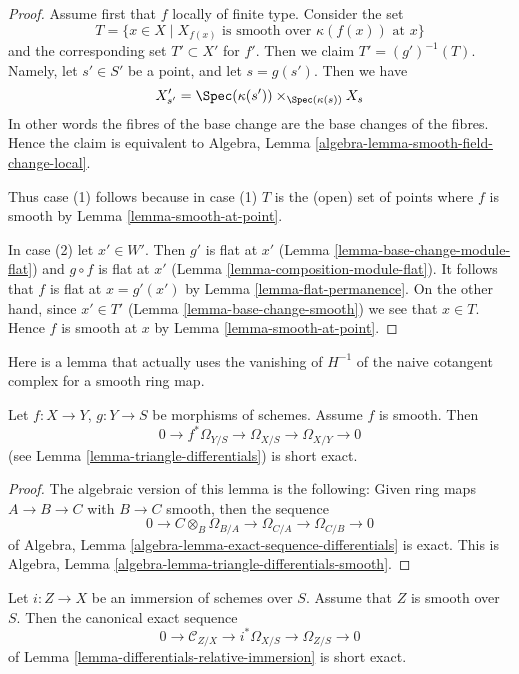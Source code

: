 \begin{proof}
Assume first that $f$ locally of finite type. Consider the set
$$
T = \{x \in X \mid X_{f(x)}\text{ is smooth over }\kappa(f(x))\text{ at }x\}
$$
and the corresponding set $T' \subset X'$ for $f'$. Then we claim
$T' = (g')^{-1}(T)$. Namely, let $s' \in S'$ be a point, and let
$s = g(s')$. Then we have
$$
X'_{s'} =
\Spec(\kappa(s')) \times_{\Spec(\kappa(s))} X_s
$$
In other words the fibres of the base change are the base changes
of the fibres. Hence the claim is equivalent to
Algebra, Lemma \ref{algebra-lemma-smooth-field-change-local}.

\medskip\noindent
Thus case (1) follows because in case (1) $T$ is the (open) set of points
where $f$ is smooth by Lemma \ref{lemma-smooth-at-point}.

\medskip\noindent
In case (2) let $x' \in W'$. Then $g'$ is flat at $x'$
(Lemma \ref{lemma-base-change-module-flat}) and
$g \circ f$ is flat at $x'$ (Lemma \ref{lemma-composition-module-flat}).
It follows that $f$ is flat at $x = g'(x')$
by Lemma \ref{lemma-flat-permanence}. On the other hand, since
$x' \in T'$ (Lemma \ref{lemma-base-change-smooth})
we see that $x \in T$. Hence $f$ is smooth at $x$ by
Lemma \ref{lemma-smooth-at-point}.
\end{proof}

\noindent
Here is a lemma that actually uses the vanishing of $H^{-1}$
of the naive cotangent complex for a smooth ring map.

\begin{lemma}
\label{lemma-triangle-differentials-smooth}
Let $f : X \to Y$, $g : Y \to S$ be morphisms of schemes.
Assume $f$ is smooth. Then
$$
0 \to f^*\Omega_{Y/S} \to \Omega_{X/S} \to \Omega_{X/Y} \to 0
$$
(see Lemma \ref{lemma-triangle-differentials}) is short exact.
\end{lemma}

\begin{proof}
The algebraic version of this lemma is the following:
Given ring maps $A \to B \to C$ with $B \to C$ smooth, then the sequence
$$
0 \to C \otimes_B \Omega_{B/A} \to \Omega_{C/A} \to \Omega_{C/B} \to 0
$$
of
Algebra, Lemma \ref{algebra-lemma-exact-sequence-differentials}
is exact. This is
Algebra, Lemma \ref{algebra-lemma-triangle-differentials-smooth}.
\end{proof}

\begin{lemma}
\label{lemma-differentials-relative-immersion-smooth}
Let $i : Z \to X$ be an immersion of schemes over $S$.
Assume that $Z$ is smooth over $S$. Then the
canonical exact sequence
$$
0 \to \mathcal{C}_{Z/X} \to i^*\Omega_{X/S} \to \Omega_{Z/S} \to 0
$$
of
Lemma \ref{lemma-differentials-relative-immersion}
is short exact.
\end{lemma}

